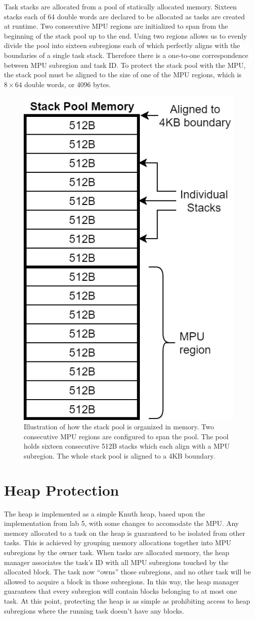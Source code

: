 Task stacks are allocated from a pool of statically allocated memory. Sixteen stacks each of 64 double words are declared to be allocated as tasks are created at runtime. Two consecutive MPU regions are initialized to span from the beginning of the stack pool up to the end. Using two regions allows us to evenly divide the pool into sixteen subregions each of which perfectly aligns with the boundaries of a single task stack. Therefore there is a one-to-one correspondence between MPU subregion and task ID. To protect the stack pool with the MPU, the stack pool must be aligned to the size of one of the MPU regions, which is $8\times64$ double words, or 4096 bytes.

\begin{figure}[hbtp]
	\centering
	\includegraphics[width=0.4\columnwidth]{figs/stack_prot.png}
	\caption{Illustration of how the stack pool is organized in memory. Two consecutive MPU regions are configured to span the pool. The pool holds sixteen consecutive 512B stacks which each align with a MPU subregion. The whole stack pool is aligned to a 4KB boundary.}
	\label{fig:stack_prot}
\end{figure}

\section{Heap Protection}

The heap is implemented as a simple Knuth heap, based upon the implementation from lab 5, with some changes to accomodate the MPU. Any memory allocated to a task on the heap is guaranteed to be isolated from other tasks. This is achieved by grouping memory allocations together into MPU subregions by the owner task. When tasks are allocated memory, the heap manager associates the task's ID with all MPU subregions touched by the allocated block. The task now ``owns'' those subregions, and no other task will be allowed to acquire a block in those subregions. In this way, the heap manager guarantees that every subregion will contain blocks belonging to at most one task. At this point, protecting the heap is as simple as prohibiting access to heap subregions where the running task doesn't have any blocks.

